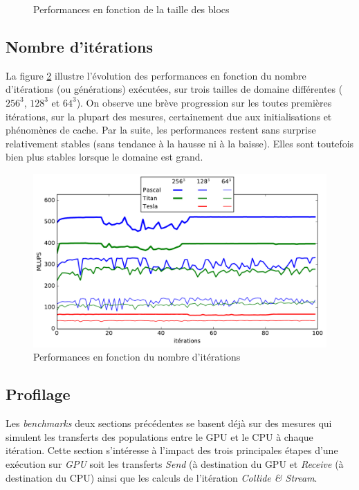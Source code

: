 \begin{figure}[h]
{		\label{fig:lups_by_bs_tesla}
	}
	\caption{Performances en fonction de la taille des blocs}
	\label{fig:lups_by_bs}
\end{figure}

\subsection{Nombre d'itérations}\label{title-iterations}

La figure \ref{fig:lups_by_iter} illustre l'évolution des performances en fonction du nombre d'itérations (ou générations) exécutées, sur trois tailles de domaine différentes ($256^3$, $128^3$ et $64^3$). On observe une brève progression sur les toutes premières itérations, sur la plupart des mesures, certainement due aux initialisations et phénomènes de cache. Par la suite, les performances restent sans surprise relativement stables (sans tendance à la hausse ni à la baisse). Elles sont toutefois bien plus stables lorsque le domaine est grand. 

\begin{figure}[H]
	\centering
	\includegraphics[fbox, scale=0.61]{images/perfs/lbm_simple_lbmcuda/lups_by_iter.pdf}
	\caption{Performances en fonction du nombre d'itérations}
	\label{fig:lups_by_iter}
\end{figure}

\subsection{Profilage} \label{title-profilage_gpu}
Les \textit{benchmarks} deux sections précédentes se basent déjà sur des mesures qui simulent les transferts des populations entre le \acs{GPU} et le \acs{CPU} à chaque itération. Cette section s'intéresse à l'impact des trois principales étapes d'une exécution sur \textit{GPU} soit les transferts \textit{Send} (à destination du \acs{GPU} et \textit{Receive} (à destination du \acs{CPU}) ainsi que les calculs de l'itération \textit{Collide \& Stream}.
	
